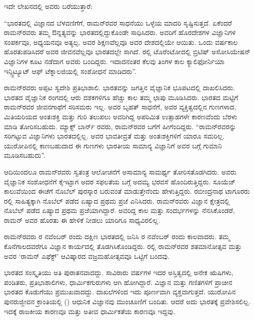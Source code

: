 ಇದೇ ಲೇಖನದಲ್ಲಿ ಅವರು ಬರೆಯುತ್ತಾರೆ:\enginline{-}

“ಭಾರತದಲ್ಲಿ ವಿಜ್ಞಾನದ ಬೆಳವಣಿಗೆಗೆ, ರಾಮನ್‍ರವರ ಸಾಧನೆಯು ಒಳ್ಳೆಯ ಮಾದರಿ ಸೃಷ್ಟಿಸುತ್ತದೆ. ಏಕೆಂದರೆ ರಾಮನ್‍ರವರು ತಮ್ಮ ಔನ್ನತ್ಯವನ್ನು ಭಾರತದಲ್ಲಿದ್ದುಕೊಂಡೇ ಸಾಧಿಸಿದರು. ಅವರಿಗೆ ಹೊರದೇಶಗಳ ವಿಜ್ಞಾನಿಗಳ ಸಂಪರ್ಕವೂ, ಅಧ್ಯಯನವೂ ಅತ್ಯಲ್ಪ. ಅವರ ಶಿಕ್ಷಣವೆಲ್ಲವೂ ಅವರ ದೇಶದಲ್ಲಿಯೇ ಆಯಿತು. ಒಂದು ವರ್ಷಕಾಲ ಹೊರತುಪಡಿಸಿದರೆ ಅವರ ಜೀವನವೆಲ್ಲವೂ ಭಾರತದಲ್ಲೇ ಸಾಗಿದೆ. ರಲ್ಲಿ ಟೊರೆಂಟೋದಲ್ಲಿ ಬ್ರಿಟಿಷ್ ಅಸೋಸಿಯೇಷನ್ ವಿಜ್ಞಾನಿಗಳ ಕೂಟ ನಡೆದಾಗ ಅವರು ಬಂದಿದ್ದರು. ಇದಾದನಂತರ ಕೆಲವು ತಿಂಗಳ ಕಾಲ ಕ್ಯಾಲಿಫೋರ್ನಿಯಾ ಇನ್ಸ್ಟಿಟ್ಯೂಟ್ ಆಫ್ ಟೆಕ್ನಾಲಜಿಯಲ್ಲಿ ಸಂಶೋಧನೆ ಮಾಡಿದರು”.

ರಾಮನ್‍ರವರು ಅಪ್ಪಟ ಸ್ವದೇಶಿ ಪ್ರತಿಭಾಶಾಲಿ. ಭಾರತವನ್ನು ಜಗತ್ತಿನ ವೈಜ್ಞಾನಿಕ ಭೂಪಟದಲ್ಲಿ ದಾಖಲಿಸಿದರು. ಭಾರತದ ವೈಜ್ಞಾನಿಕ ರಂಗದಲ್ಲಿ ಆರು ದಶಕಗಳಿಗೂ ಹೆಚ್ಚು ಕಾಲ ತಮ್ಮ ಛಾಪು ಮೂಡಿಸಿದರು. ಭಾರತದ ಮಟ್ಟಿಗೆ ರಾಮನ್‍ರವರ ಜೀವನಗಾಥೆಗೆ ಸರಿಸಮರು ಇಲ್ಲ. ಅವರ ಬೃಹತ್ ಸಾಧನೆಗೆ, ಅವರ ವ್ಯಕ್ತಿತ್ವದಲ್ಲಿನ ಗುಣಗಳಾದ, ಮಿತಿಯರಿಯದ ಅಂತಃಶಕ್ತಿ ಮತ್ತು ಗುರಿ ತಲುಪಲು ಅವರಿಗಿದ್ದ ಅಪರಿಮಿತ ಉತ್ಸಾಹಗಳೇ ಕಾರಣವೆಂದು ಬೆರಳು ಮಾಡಿ ತೋರಿಸಬಹುದು. ಮ್ಯಾಕ್ಸ್ ಬಾರ್ನ್ ರವರು, ರಾಮನ್‍ರವರ ಬಗೆಗೆ ಹೀಗೆಂದಿದ್ದರು.  “ರಾಮನ್‍ರವರನ್ನು ಸರಿಗಟ್ಟುವ ವಿಜ್ಞಾನಿಗಳು ಭಾರತದಲ್ಲಿಲ್ಲ. ಅವರ ಭಾವತೀವ್ರತೆ ಮತ್ತು ಅಂತಃಶಕ್ತಿಗಳಿಗೆ ಯಾರೂ ಸಮರಿಲ್ಲ. ಯುರೋಪಿನಲ್ಲಿ ಕಾಣಬಹುದಾದ ಈ ಗುಣಗಳು ಭಾರತೀಯ ಸಾಮಾನ್ಯ ವಿಜ್ಞಾನಿಗೆ ಅವರ ಬಗ್ಗೆ ಗುಮಾನಿ ಮೂಡಿಸಬಹುದು”.

ಆದಿಯಿಂದಲೂ ರಾಮನ್‍ರವರು ಸ್ವತಂತ್ರ ಆಲೋಚನೆಗೆ ಅಸಾಮಾನ್ಯ ಸಾಮರ್ಥ್ಯ ತೋರಿಸತೊಡಗಿದರು. ಅವರು ವೈಜ್ಞಾನಿಕ ಸಂಶೋಧನೆಗೆ ಕೈಇಟ್ಟಾಗ ಅದರ ಸಫಲತೆಯ ಬಗ್ಗೆ ಅದಮ್ಯ ಭರವಸೆ ಹೊಂದಿರುತ್ತಿದ್ದರು. ಸೂಯೆಜ್ ಕಾಲುವೆಯಿಂದ ಈಚೆಗೆ ನೊಬೆಲ್ ಪುರಸ್ಕಾರ ಬರುವಂತೆ ಮಾಡುತ್ತೇನೆಂದು ಹೇಳುತ್ತಿದ್ದರು. ರಬೀಂದ್ರನಾಥ ಟಾಗೂರರು ರಲ್ಲಿ ಸಾಹಿತ್ಯಕ್ಕಾಗಿ ನೊಬೆಲ್ ಪಡೆದ ಏಷ್ಯಾದ ಪ್ರಥಮ ಪ್ರಜೆ ಎನಿಸಿದರು. ರಾಮನ್‍ರವರು ವಿಜ್ಞಾನ ಕ್ಷೇತ್ರದಲ್ಲಿ ನೊಬೆಲ್ ಪಡೆದ ಏಷ್ಯಾದ ಪ್ರಥಮ ಪ್ರಜೆಯಾಗಿದ್ದಾರೆ. ಅವರಿದ್ದ ಕಾಲ ಮತ್ತು ಸಂದರ್ಭಗಳನ್ನು ನೆನಸಿಕೊಂಡರೆ, ರಾಮನ್‍ ಅವರ ಹೊರತು ಈ ಹೇಳಿಕೆ ನೀಡಲು ಯಾರಿಗೂ ಸಾಧ್ಯವಿರಲಿಲ್ಲ.

ರಾಮನ್‍ರವರು ರ ನವೆಂಬರ್ ರಂದು ದಕ್ಷಿಣ ಭಾರತದಲ್ಲಿ ಜನಿಸಿ ರ ನವೆಂಬರ್ ರಂದು ಕಾಲವಾದರು. ತಮ್ಮ ಕೊನೆಗಾಲದವರೆಗೂ ವಿಜ್ಞಾನ ಕಾರ್ಯದಲ್ಲಿ ತೊಡಗಿಸಿಕೊಂಡಿದ್ದರು. ರಲ್ಲಿ ರಾಮನ್‍ರವರ ಶತಮಾನೋತ್ಸವ ಮತ್ತು ಅವರ ‘ರಾಮನ್ ಎಫೆಕ್ಟ್’ ಆವಿಷ್ಕಾರದ ವಜ್ರಮಹೋತ್ಸವವೂ ಒಟ್ಟಿಗೆ ಬಂದವು.



ಭಾರತದ ಸಂಸ್ಕೃತಿಯು ಅತಿ ಪುರಾತನವಾದದ್ದು. ಸಾವಿರಾರು ವರ್ಷಗಳ ಇದರ ಅಸ್ತಿತ್ವದಲ್ಲಿ ಅನೇಕ ಋಷಿಗಳು, ಪಂಡಿತರು, ಪ್ರತಿಭಾಶಾಲಿಗಳು, ಧಾರ್ಮಿಕಗುರುಗಳು ಆಗಿ ಹೋಗಿದ್ದಾರೆ. ವಿಜ್ಞಾನ ಮತ್ತು ಗಣಿತಗಳಿಗೆ ಪ್ರಾಚೀನ ಭಾರತದ ಕೊಡುಗೆಯು ಪ್ರಮುಖವಾದದ್ದು. ದಾಖಲೆಗಳಿಂದ ಇದು ಪೂರ್ಣವಾಗಿ ವ್ಯಕ್ತವಾಗುತ್ತದೆ. ಯುರೋಪಿನ ಪುನರುಜ್ಜೀವನ ಕ್ರಾಂತಿಯಲ್ಲಿ () ಆಧುನಿಕ ವಿಜ್ಞಾನವು ಮುಂಚೂಣಿಗೆ ಬಂದಿತು. ಆದರೆ ಅದು ಭಾರತಕ್ಕೆ ಪ್ರವೇಶಿಸಲಿಲ್ಲ. ಇದಕ್ಕೆ ರಾಜಕೀಯ ಕಾರಣವೂ ಮತ್ತು ಅತೀವ ಧಾರ್ಮಿಕತೆಯ ಕಾರಣವೂ ಇದ್ದವು.


